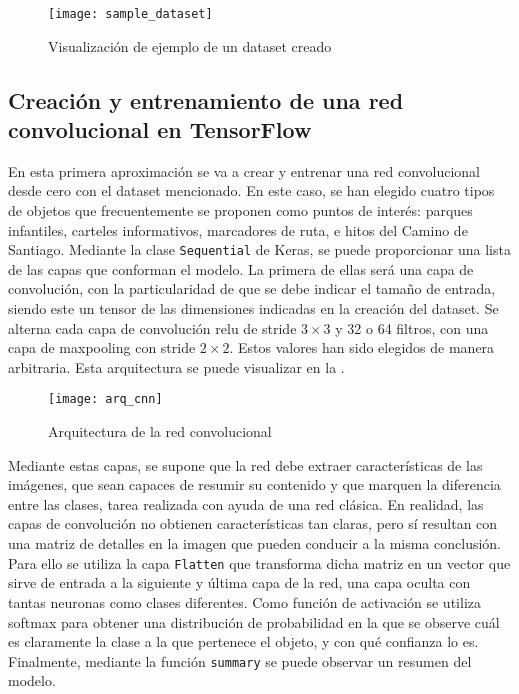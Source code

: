 			\begin{figure}
				\centering
				\texttt{[image: sample\_dataset]}
				\caption{Visualización de ejemplo de un dataset creado}
				\label{fig:sample_dataset}
			\end{figure}
			
		\subsection{Creación y entrenamiento de una red convolucional en TensorFlow}\label{subsec:crear_cnn}
		
			En esta primera aproximación se va a crear y entrenar una red convolucional desde cero con el dataset mencionado. En este caso, se han elegido cuatro tipos de objetos que frecuentemente se proponen como puntos de interés: parques infantiles, carteles informativos, marcadores de ruta, e hitos del Camino de Santiago. Mediante la clase \texttt{Sequential} de Keras, se puede proporcionar una lista de las capas que conforman el modelo. La primera de ellas será una capa de convolución, con la particularidad de que se debe indicar el tamaño de entrada, siendo este un tensor de las dimensiones indicadas en la creación del dataset. Se alterna cada capa de convolución \gls{relu} de stride $3 \times 3$ y 32 o 64 filtros, con una capa de maxpooling con stride $2 \times 2$. Estos valores han sido elegidos de manera arbitraria. Esta arquitectura se puede visualizar en la . \\
			
			\begin{figure}[!h]
				\centering
				\texttt{[image: arq\_cnn]}
				\caption{Arquitectura de la red convolucional}
				\label{fig:arq_cnn}
			\end{figure}
			
			Mediante estas capas, se supone que la red debe extraer características de las imágenes, que sean capaces de resumir su contenido y que marquen la diferencia entre las clases, tarea realizada con ayuda de una red clásica. En realidad, las capas de convolución no obtienen características tan claras, pero sí resultan con una matriz de detalles en la imagen que pueden conducir a la misma conclusión. Para ello se utiliza la capa \texttt{Flatten} que transforma dicha matriz en un vector que sirve de entrada a la siguiente y última capa de la red, una capa oculta con tantas neuronas como clases diferentes. Como función de activación se utiliza softmax para obtener una distribución de probabilidad en la que se observe cuál es claramente la clase a la que pertenece el objeto, y con qué confianza lo es. Finalmente, mediante la función \texttt{summary} se puede observar un resumen del modelo. 
			
